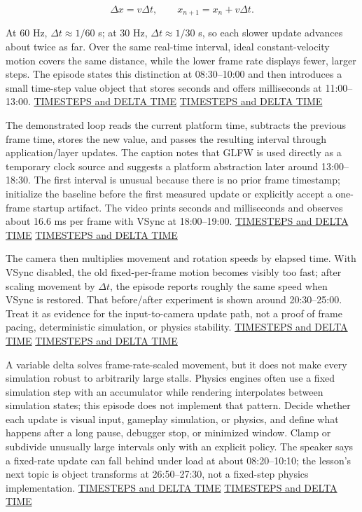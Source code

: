 \[\Delta x=v\Delta t, \qquad x_{n+1}=x_n+v\Delta t.\]

At 60 Hz, \(\Delta t\approx 1/60\) s; at 30 Hz, \(\Delta t\approx 1/30\) s, so each slower update advances about twice as far. Over the same real-time interval, ideal constant-velocity motion covers the same distance, while the lower frame rate displays fewer, larger steps. The episode states this distinction at 08:30--10:00 and then introduces a small time-step value object that stores seconds and offers milliseconds at 11:00--13:00. \href{https://www.youtube.com/watch?v=pctGOMDW-HQ&t=510s}{TIMESTEPS and DELTA TIME} \href{https://www.youtube.com/watch?v=pctGOMDW-HQ&t=660s}{TIMESTEPS and DELTA TIME}

The demonstrated loop reads the current platform time, subtracts the previous frame time, stores the new value, and passes the resulting interval through application/layer updates. The caption notes that GLFW is used directly as a temporary clock source and suggests a platform abstraction later around 13:00--18:30. The first interval is unusual because there is no prior frame timestamp; initialize the baseline before the first measured update or explicitly accept a one-frame startup artifact. The video prints seconds and milliseconds and observes about 16.6 ms per frame with VSync at 18:00--19:00. \href{https://www.youtube.com/watch?v=pctGOMDW-HQ&t=780s}{TIMESTEPS and DELTA TIME} \href{https://www.youtube.com/watch?v=pctGOMDW-HQ&t=1080s}{TIMESTEPS and DELTA TIME}

The camera then multiplies movement and rotation speeds by elapsed time. With VSync disabled, the old fixed-per-frame motion becomes visibly too fast; after scaling movement by \(\Delta t\), the episode reports roughly the same speed when VSync is restored. That before/after experiment is shown around 20:30--25:00. Treat it as evidence for the input-to-camera update path, not a proof of frame pacing, deterministic simulation, or physics stability. \href{https://www.youtube.com/watch?v=pctGOMDW-HQ&t=1230s}{TIMESTEPS and DELTA TIME} \href{https://www.youtube.com/watch?v=pctGOMDW-HQ&t=1350s}{TIMESTEPS and DELTA TIME}

A variable delta solves frame-rate-scaled movement, but it does not make every simulation robust to arbitrarily large stalls. Physics engines often use a fixed simulation step with an accumulator while rendering interpolates between simulation states; this episode does not implement that pattern. Decide whether each update is visual input, gameplay simulation, or physics, and define what happens after a long pause, debugger stop, or minimized window. Clamp or subdivide unusually large intervals only with an explicit policy. The speaker says a fixed-rate update can fall behind under load at about 08:20--10:10; the lesson's next topic is object transforms at 26:50--27:30, not a fixed-step physics implementation. \href{https://www.youtube.com/watch?v=pctGOMDW-HQ&t=500s}{TIMESTEPS and DELTA TIME} \href{https://www.youtube.com/watch?v=pctGOMDW-HQ&t=1610s}{TIMESTEPS and DELTA TIME}

